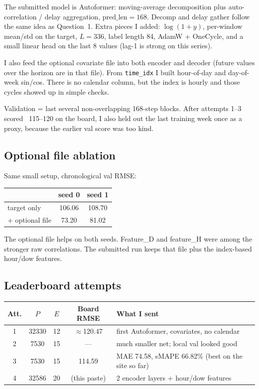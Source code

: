 \documentclass[11pt,a4paper]{article}
\begin{document}
The submitted model is Autoformer: moving-average decomposition plus auto-correlation / delay aggregation, $\mathrm{pred\_len}=168$. Decomp and delay gather follow the same idea as Question~1. Extra pieces I added: $\log(1+y)$, per-window mean/std on the target, $L=336$, label length 84, AdamW + OneCycle, and a small linear head on the last 8 values (lag-1 is strong on this series).

I also feed the optional covariate file into both encoder and decoder (future values over the horizon are in that file). From \texttt{time\_idx} I built hour-of-day and day-of-week sin/cos. There is no calendar column, but the index is hourly and those cycles showed up in simple checks.

Validation = last several non-overlapping 168-step blocks. After attempts 1--3 scored ~115--120 on the board, I also held out the last training week once as a proxy, because the earlier val score was too kind.

\subsection{Optional file ablation}

Same small setup, chronological val RMSE:

\begin{center}
\begin{tabular}{lcc}
\toprule
 & seed 0 & seed 1 \\
\midrule
target only & 106.06 & 108.70 \\
+ optional file & 73.20 & 81.02 \\
\bottomrule
\end{tabular}
\end{center}

The optional file helps on both seeds. Feature\_D and feature\_H were among the stronger raw correlations. The submitted run keeps that file plus the index-based hour/dow features.

\subsection{Leaderboard attempts}

\begin{center}
\small
\begin{tabular}{ccccp{5.6cm}}
\toprule
Att. & $P$ & $E$ & Board RMSE & What I sent \\
\midrule
1 & 32330 & 12 & $\approx$120.47 & first Autoformer, covariates, no calendar \\
2 & 7530 & 15 & --- & much smaller net; local val looked good \\
3 & 7530 & 15 & 114.59 & MAE 74.58, sMAPE 66.82\% (best on the site so far) \\
4 & 32586 & 20 & (this paste) & 2 encoder layers + hour/dow features \\
\bottomrule
\end{tabular}
\end{center}
\end{document}

